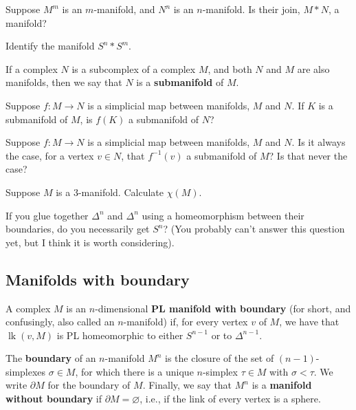 \documentclass[12pt]{pset}
\newcommand{\defnword}[1]{\textbf{#1}}
\newcommand{\boundary}{\partial}
\newcommand{\join}{\ast}
\DeclareMathOperator{\lk}{lk}
\begin{document}
\begin{problem}
  Suppose $M^m$ is an $m$-manifold, and $N^n$ is an $n$-manifold.  Is
  their join, $M \join N$, a manifold?
\end{problem}

\begin{requiredproblem}
  Identify the manifold $S^n \join S^m$.
\end{requiredproblem}

\begin{definition*}
  If a complex $N$ is a subcomplex of a complex $M$, and both $N$ and
  $M$ are also manifolds, then we say that $N$ is a
  \textbf{submanifold} of $M$.
\end{definition*}

\begin{problem}
 Suppose $f : M \to N$ is a simplicial map between manifolds, $M$ and $N$.
 If $K$ is a submanifold of $M$, is $f(K)$ a submanifold of $N$?
\end{problem}

\begin{problem}
 Suppose $f : M \to N$ is a simplicial map between manifolds, $M$ and $N$.
 Is it always the case, for a vertex $v \in N$, that $f^{-1}(v)$ a
 submanifold of $M$?  Is that never the case?
\end{problem}

\begin{problem}
Suppose $M$ is a 3-manifold.  Calculate $\chi(M)$.
\end{problem}

\begin{problem}
  If you glue together $\Delta^n$ and $\Delta^n$ using a homeomorphism
  between their boundaries, do you necessarily get $S^n$?  (You
  probably can't answer this question yet, but I think it is worth
  considering).
\end{problem}

\subsection*{Manifolds with boundary}

\begin{definition*}
  A complex $M$ is an $n$-dimensional \textbf{PL manifold with
    boundary} (for short, and confusingly, also called an
  $n$-manifold) if, for every vertex $v$ of $M$, we have that
  $\lk(v,M)$ is PL homeomorphic to either $S^{n-1}$ or to $\Delta^{n-1}$.

  The \textbf{boundary} of an $n$-manifold $M^n$ is the closure of
  the set of $(n-1)$-simplexes $\sigma \in M$, for which there is a
  unique $n$-simplex $\tau \in M$ with $\sigma < \tau$.
We write $\boundary M$ for the boundary of $M$.  Finally, we say that
$M^n$ is a \defnword{manifold without boundary} if $\boundary M =
\varnothing$, i.e., if the link of every vertex is a sphere.
\end{definition*}
\end{document}
